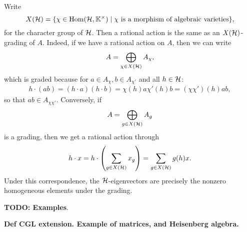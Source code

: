 Write
\begin{equation*}
	X(\mathcal{H}) = \{\chi \in \operatorname{Hom}(\mathcal{H}, \mathbb{K}^\times) \mid \chi \text{ is a morphism of algebraic varieties}\},
\end{equation*}
%
for the character group of $\mathcal{H}$. Then a rational action is the
same as an $X(\mathcal{H})$-grading of $A$. Indeed, if we have a rational
action on $A$, then we can write
\begin{equation*}
	A = \bigoplus_{\chi \in X(\mathcal{H})} A_\chi,
\end{equation*}
which is graded because for $a \in A_\chi, b \in A_{\chi'}$ and all $h \in \mathcal{H}$:
\begin{align*}
	h \cdot (a b) = (h\cdot a)(h\cdot b)= \chi(h)a \chi'(h)b = (\chi \chi')(h)ab,
\end{align*}
so that $ab \in A_{\chi \chi'}$. Conversely, if
\begin{equation*}
	A = \bigoplus_{g \in X(\mathcal{H})} A_g
\end{equation*}
is a grading, then we get a rational action through
\begin{equation*}
	h \cdot x = h \cdot \left(\sum_{g \in X(\mathcal{H})} x_g \right) = \sum_{g \in X(\mathcal{H})} g(h)x.
\end{equation*}
%
Under this correspondence, the $\mathcal{H}$-eigenvectors are precisely the nonzero
homogeneous elements under the grading.

\textbf{TODO: Examples}.

\textbf{Def CGL extension. Example of matrices, and Heisenberg algebra.}

